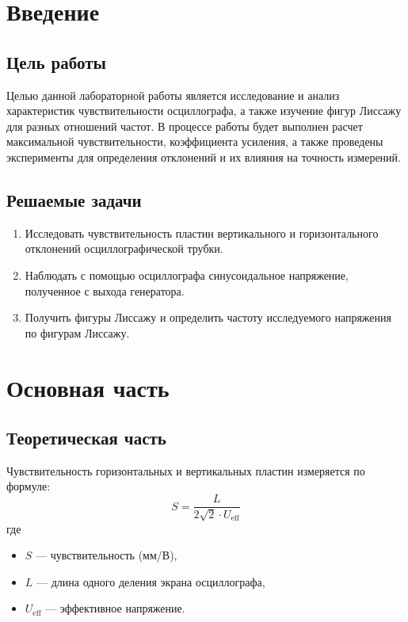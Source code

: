 

\section{Введение}
\subsection{Цель работы}
Целью данной лабораторной работы является исследование и анализ характеристик чувствительности осциллографа, а также изучение фигур Лиссажу для разных отношений частот. В процессе работы будет выполнен расчет максимальной чувствительности, коэффициента усиления, а также проведены эксперименты для определения отклонений и их влияния на точность измерений.

\subsection{Решаемые задачи}
\begin{enumerate}
  \item Исследовать чувствительность пластин вертикального и горизонтального отклонений осциллографической трубки. 
  \item Наблюдать с помощью осциллографа синусоидальное напряжение, полученное с выхода генератора. 
  \item Получить фигуры Лиссажу и определить частоту исследуемого напряжения по фигурам Лиссажу.
\end{enumerate}

\section{Основная часть}

\subsection{Теоретическая часть}
Чувствительность горизонтальных и вертикальных пластин измеряется по формуле:
\begin{equation}
S = \frac{L}{2 \sqrt{2} \cdot U_{\text{eff}}}
\end{equation}
где \begin{itemize}
    \item \( S \) — чувствительность (мм/В),
    \item \( L \) — длина одного деления экрана осциллографа,
    \item \( U_{\text{eff}} \) — эффективное напряжение.
\end{itemize}


